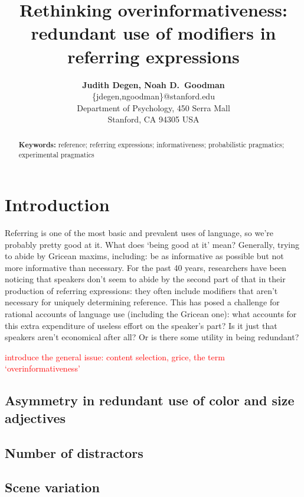 \documentclass[11pt]{article}
\title{Rethinking overinformativeness: redundant use of modifiers in referring expressions}
\author{{\large \bf Judith Degen, Noah D.~Goodman} \\
  \{jdegen,ngoodman\}@stanford.edu\\
  Department of Psychology, 450 Serra Mall \\
  Stanford, CA 94305 USA}
\newcommand{\red}[1]{\textcolor{Red}{#1}}
\begin{document}
\maketitle


\begin{abstract}
 

\textbf{Keywords:} 
reference; referring expressions; informativeness; probabilistic pragmatics; experimental pragmatics
\end{abstract}

\section{Introduction}
\label{sec:intro}

Referring is one of the most basic and prevalent uses of language, so we're probably pretty good at it. What does `being good at it' mean? Generally, trying to abide by Gricean maxims, including: be as informative as possible but not more informative than necessary. For the past 40 years, researchers have been noticing that speakers don't seem to abide by the second part of that in their production of referring expressions: they often include modifiers that aren't necessary for uniquely determining reference. This has posed a challenge for rational accounts of language use (including the Gricean one): what accounts for this extra expenditure of useless effort on the speaker's part? Is it just that speakers aren't economical after all? Or is there some utility in being redundant?

	\red{introduce the general issue: content selection, grice, the term `overinformativeness'}

\subsection{Asymmetry in redundant use of color and size adjectives}
\label{sec:asymmetry}

\subsection{Number of distractors}
\label{sec:numdistractors}

\subsection{Scene variation}
\label{sec:scenevariation}
\end{document}
